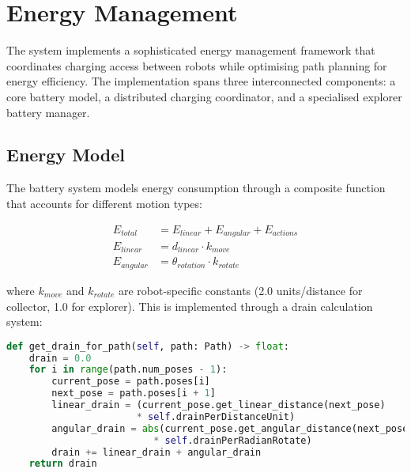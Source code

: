 \documentclass{csfourzero}
\begin{document}



\section{Energy Management}

The system implements a sophisticated energy management framework \cite{burgard2002coordinated} that coordinates charging access between robots while optimising path planning for energy efficiency. The implementation spans three interconnected components: a core battery model, a distributed charging coordinator, and a specialised explorer battery manager.

\subsection{Energy Model}

The battery system models energy consumption through a composite function that accounts for different motion types:

\begin{align*}
E_{total} &= E_{linear} + E_{angular} + E_{actions} \\
E_{linear} &= d_{linear} \cdot k_{move} \\
E_{angular} &= \theta_{rotation} \cdot k_{rotate}
\end{align*}

where $k_{move}$ and $k_{rotate}$ are robot-specific constants (2.0 units/distance for collector, 1.0 for explorer). This is implemented through a drain calculation system:

\begin{lstlisting}[language=Python]
def get_drain_for_path(self, path: Path) -> float:
    drain = 0.0
    for i in range(path.num_poses - 1):
        current_pose = path.poses[i]
        next_pose = path.poses[i + 1]
        linear_drain = (current_pose.get_linear_distance(next_pose) 
                       * self.drainPerDistanceUnit)
        angular_drain = abs(current_pose.get_angular_distance(next_pose) 
                          * self.drainPerRadianRotate)
        drain += linear_drain + angular_drain
    return drain
\end{lstlisting}
\end{document}
